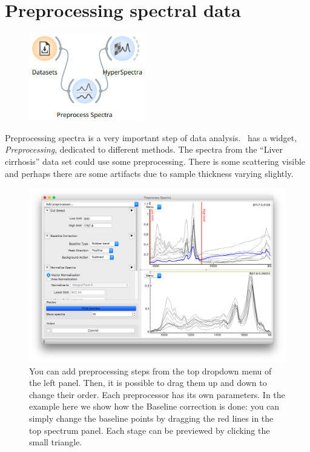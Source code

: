 \chapter{Preprocessing spectral data}
\label{ch:spectral_preprocessing}


\begin{figure}
    \centering
    \vspace{-3.4cm}
    \includegraphics[width=0.45\textwidth]{workflow-preprocessing.png}
    \label{fig:spectral_preprocessing-fig1}
\end{figure}

Preprocessing spectra is a very important step of data analysis. \mutation\ has a widget, \textit{Preprocessing}, dedicated to different methods. The spectra from the ``Liver cirrhosis'' data set could use some preprocessing. There is some scattering visible and perhaps there are some artifacts due to sample thickness varying slightly.

\begin{figure}[h]
    \vspace{-0.2cm}
    \includegraphics[scale=0.28]{spectral_preprocessing-fig2.png}
    \caption{You can add preprocessing steps from the top dropdown menu of the left panel. Then, it is possible to drag them up and down to change their order. Each preprocessor has its own parameters. In the example here we show how the Baseline correction is done: you can simply change the baseline points by dragging the red lines in the top spectrum panel. Each stage can be previewed by clicking the small triangle.}
    \label{fig:spectral_preprocessing-fig2}
\end{figure}

